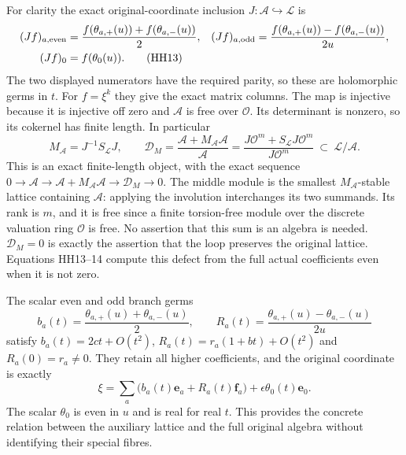 \documentclass[11pt,a4paper]{article}
\theoremstyle{definition}\newtheorem{definition}[theorem]{Definition}
\begin{document}
For clarity the exact original-coordinate inclusion
$J:\mathcal A\hookrightarrow\mathcal L$ is
\begin{align}
 (Jf)_{a,\mathrm{even}}&=
   \frac{f(\theta_{a,+}(u))+f(\theta_{a,-}(u))}{2},&
 (Jf)_{a,\mathrm{odd}}&=
   \frac{f(\theta_{a,+}(u))-f(\theta_{a,-}(u))}{2u},\notag\\
 (Jf)_0&=f(\theta_0(u)).
 \tag{HH13}\label{hh:inclusion}
\end{align}
The two displayed numerators have the required parity, so these
are holomorphic germs in $t$. For $f=\xi^k$ they give the exact
matrix columns. The map is injective because it is injective off
zero and $\mathcal A$ is free over $\mathcal O$. Its determinant is
nonzero, so its cokernel has finite length. In particular
\[
 M_{\mathcal A}=J^{-1}S_{\mathcal L}J,\qquad
 \mathcal D_M=
   \frac{\mathcal A+M_{\mathcal A}\mathcal A}{\mathcal A}
   =\frac{J\mathcal O^m+S_{\mathcal L}J\mathcal O^m}
          {J\mathcal O^m}
   \ \subset\ \mathcal L/\mathcal A .
 \tag{HH14}\label{hh:lattice-defect}
\]
This is an exact finite-length object, with the exact sequence
$0\to\mathcal A\to\mathcal A+M_{\mathcal A}\mathcal A
\to\mathcal D_M\to0$.
The middle module is the smallest $M_{\mathcal A}$-stable lattice
containing $\mathcal A$: applying the involution interchanges its two
summands. Its rank is $m$, and it is free since a finite torsion-free
module over the discrete valuation ring $\mathcal O$ is free.
No assertion that this sum is an algebra is needed.
$\mathcal D_M=0$ is exactly the assertion that the loop preserves
the original lattice. Equations HH13--14 compute this defect from
the full actual coefficients even when it is not zero.

The scalar even and odd branch germs
\[
 b_a(t)=\frac{\theta_{a,+}(u)+\theta_{a,-}(u)}2,\qquad
 R_a(t)=\frac{\theta_{a,+}(u)-\theta_{a,-}(u)}{2u}
 \tag{HH15}
\]
satisfy $b_a(t)=2ct+O(t^2)$,
$R_a(t)=r_a(1+bt)+O(t^2)$ and $R_a(0)=r_a\ne0$.
They retain all higher coefficients, and the original coordinate is
exactly
\[
 \xi=\sum_a\bigl(b_a(t)\mathbf e_a+R_a(t)\mathbf f_a\bigr)
                     +\epsilon\theta_0(t)\mathbf e_0 .
 \tag{HH16}\label{hh:coordinate}
\]
The scalar $\theta_0$ is even in $u$ and is real for real $t$.
This provides the concrete relation between the auxiliary lattice
and the full original algebra without identifying their special fibres.
\end{document}
